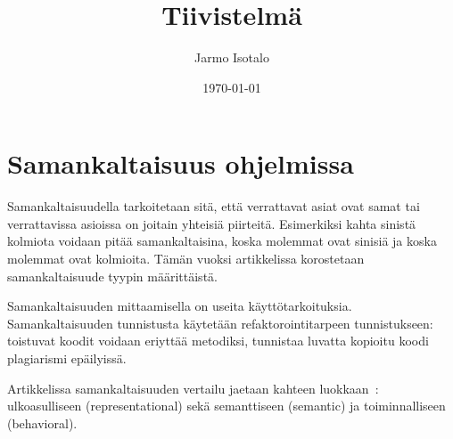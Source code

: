 \documentclass[finnish]{../tktltiki2}
\title{Tiivistelmä}
\author{Jarmo Isotalo}
\date{\today}
\theoremstyle{definition}
\theoremstyle{remark}
\begin{document}

\frontmatter      %

\maketitle        %


\mainmatter
\section{Samankaltaisuus ohjelmissa}

Samankaltaisuudella tarkoitetaan sitä, että verrattavat asiat ovat samat tai verrattavissa asioissa on joitain yhteisiä piirteitä. Esimerkiksi kahta sinistä kolmiota voidaan pitää samankaltaisina, koska molemmat ovat sinisiä ja koska molemmat ovat kolmioita. Tämän vuoksi artikkelissa korostetaan samankaltaisuude tyypin määrittäistä.

Samankaltaisuuden mittaamisella on useita käyttötarkoituksia. Samankaltaisuuden tunnistusta käytetään refaktorointitarpeen tunnistukseen: toistuvat koodit voidaan eriyttää metodiksi, tunnistaa luvatta kopioitu koodi plagiarismi epäilyissä.

Artikkelissa samankaltaisuuden vertailu jaetaan kahteen luokkaan~\cite{Walenstein_similarityin}: ulkoasulliseen (representational) sekä semanttiseen (semantic) ja toiminnalliseen (behavioral). 

\end{document}

